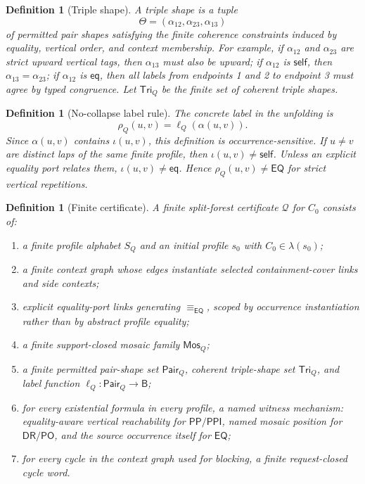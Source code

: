 \documentclass[11pt]{article}
\newtheorem{definition}[theorem]{Definition}
\newcommand{\Base}{\mathsf B}
\newcommand{\EQ}{\mathsf{EQ}}
\newcommand{\PP}{\mathsf{PP}}
\newcommand{\PPI}{\mathsf{PPI}}
\newcommand{\PO}{\mathsf{PO}}
\newcommand{\DR}{\mathsf{DR}}
\newcommand{\Q}{\mathcal Q}
\newcommand{\Mos}{\mathsf{Mos}}
\newcommand{\eqc}{\equiv_{\EQ}}
\newcommand{\Pair}{\mathsf{Pair}}
\newcommand{\Tri}{\mathsf{Tri}}
\newcommand{\self}{\mathsf{self}}
\newcommand{\eqtag}{\mathsf{eq}}
\begin{document}
\begin{definition}[Triple shape]
A triple shape is a tuple
\[
  \Theta=(\alpha_{12},\alpha_{23},\alpha_{13})
\]
of permitted pair shapes satisfying the finite coherence constraints induced by equality, vertical order, and context membership.  For example, if \(\alpha_{12}\) and \(\alpha_{23}\) are strict upward vertical tags, then \(\alpha_{13}\) must also be upward; if \(\alpha_{12}\) is \(\self\), then \(\alpha_{13}=\alpha_{23}\); if \(\alpha_{12}\) is \(\eqtag\), then all labels from endpoints 1 and 2 to endpoint 3 must agree by typed congruence.  Let \(\Tri_Q\) be the finite set of coherent triple shapes.
\end{definition}

\begin{definition}[No-collapse label rule]\label{def:no-collapse}
The concrete label in the unfolding is
\[
  \rho_Q(u,v)=\ell_Q(\alpha(u,v)).
\]
Since \(\alpha(u,v)\) contains \(\iota(u,v)\), this definition is occurrence-sensitive.  If \(u\ne v\) are distinct laps of the same finite profile, then \(\iota(u,v)\ne\self\).  Unless an explicit equality port relates them, \(\iota(u,v)\ne\eqtag\).  Hence \(\rho_Q(u,v)\ne\EQ\) for strict vertical repetitions.
\end{definition}

\begin{definition}[Finite certificate]\label{def:cert}
A finite split-forest certificate \(\Q\) for \(C_0\) consists of:
\begin{enumerate}[label=(C\arabic*)]
\item a finite profile alphabet \(S_Q\) and an initial profile \(s_0\) with \(C_0\in\lambda(s_0)\);
\item a finite context graph whose edges instantiate selected containment-cover links and side contexts;
\item explicit equality-port links generating \(\eqc\), scoped by occurrence instantiation rather than by abstract profile equality;
\item a finite support-closed mosaic family \(\Mos_Q\);
\item a finite permitted pair-shape set \(\Pair_Q\), coherent triple-shape set \(\Tri_Q\), and label function \(\ell_Q:\Pair_Q\to\Base\);
\item for every existential formula in every profile, a named witness mechanism: equality-aware vertical reachability for \(\PP/\PPI\), named mosaic position for \(\DR/\PO\), and the source occurrence itself for \(\EQ\);
\item for every cycle in the context graph used for blocking, a finite request-closed cycle word.
\end{enumerate}
\end{definition}
\end{document}
